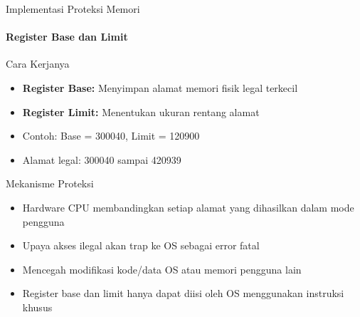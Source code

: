 \documentclass[10pt,aspectratio=169]{beamer}
\begin{document}
\begin{frame}{Implementasi Proteksi Memori}
    \framesubtitle{Register Base dan Limit}
    
    \begin{block}{Cara Kerjanya}
        \begin{itemize}
            \item \textbf{Register Base:} Menyimpan alamat memori fisik legal terkecil
            \item \textbf{Register Limit:} Menentukan ukuran rentang alamat
            \item Contoh: Base = 300040, Limit = 120900
            \item Alamat legal: 300040 sampai 420939
        \end{itemize}
    \end{block}
    
    \begin{alertblock}{Mekanisme Proteksi}
        \begin{itemize}
            \item Hardware CPU membandingkan setiap alamat yang dihasilkan dalam mode pengguna
            \item Upaya akses ilegal akan trap ke OS sebagai error fatal
            \item Mencegah modifikasi kode/data OS atau memori pengguna lain
            \item Register base dan limit hanya dapat diisi oleh OS menggunakan instruksi khusus
        \end{itemize}
    \end{alertblock}
\end{frame}
\end{document}
